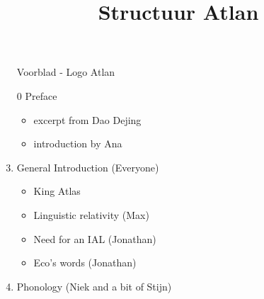 \documentclass[a3paper]{article}
\title{Structuur Atlan}
\author{}\date{}
\begin{document}
\maketitle
{}
\Large

\begin{enumerate}
\item[] Voorblad - Logo Atlan
     
\item[0] Preface
\begin{itemize}
	\item excerpt from Dao Dejing
	\item introduction by Ana
\end{itemize}
\item General Introduction (Everyone)

 \begin{itemize}
 \item King Atlas
 \item Linguistic relativity (Max)
 \item Need for an IAL (Jonathan)
 \item Eco's words (Jonathan)
 \end{itemize}
\item Phonology (Niek and a bit of Stijn)                                                                                                                                


\end{enumerate}
\end{document}
